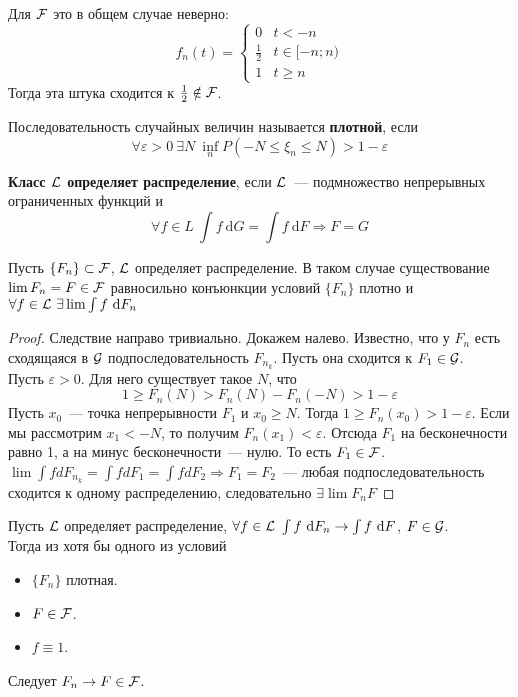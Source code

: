 \documentclass{article}
\begin{document}
    \begin{remark}
        Для ${\mathcal{F}}$ это в общем случае неверно:
        $$
        f_n(t)=\begin{cases}
            0 & t<-n\\
            \frac12 & t\in[-n;n)\\
            1 & t\geqslant n
        \end{cases}
        $$
        Тогда эта штука сходится к $\frac12\notin{\mathcal{F}}$.
    \end{remark}
    \begin{definition}
        Последовательность случайных величин называется \textbf{плотной}, если
        $$
        \forall\varepsilon>0~\exists N~\inf\limits_n P(-N\leqslant\xi_n\leqslant N)>1-\varepsilon
        $$
    \end{definition}
    \begin{definition}
        \textbf{Класс ${\mathcal{L}}$ определяет распределение}, если ${\mathcal{L}}$~--- подмножество непрерывных ограниченных функций и
        $$\forall f\in L~\int f~\mathrm dG=\int f~\mathrm dF\Rightarrow F=G$$
    \end{definition}
    \begin{theorem}
        Пусть $\{F_n\}\subset{\mathcal{F}}$, ${\mathcal{L}}$ определяет распределение. В таком случае существование $\lim F_n=F\in {\mathcal{F}}$ равносильно конъюнкции условий $\{F_n\}$ плотно и $\forall f\in{\mathcal{L}}~\exists \lim\int f~\mathrm dF_n$
    \end{theorem}
    \begin{proof}
        Следствие направо тривиально. Докажем налево. Известно, что у $F_n$ есть сходящаяся в ${\mathcal{G}}$ подпоследовательность $F_{n_k}$. Пусть она сходится к $F_1\in{\mathcal{G}}$.\\
        Пусть $\varepsilon>0$. Для него существует такое $N$, что
        $$
        1\geqslant F_n(N)>F_n(N)-F_n(-N)>1-\varepsilon
        $$
        Пусть $x_0$~--- точка непрерывности $F_1$ и $x_0\geqslant N$. Тогда $1\geqslant F_n(x_0)>1-\varepsilon$. Если мы рассмотрим $x_1<-N$, то получим $F_n(x_1)<\varepsilon$. Отсюда $F_1$ на бесконечности равно 1, а на минус бесконечности~--- нулю. То есть $F_1\in{\mathcal{F}}$.\\
         $\lim\int fdF_{n_k}=\int fdF_1=\int fdF_2\Rightarrow F_1=F_2$~--- любая подпоследовательность сходится к одному распределению, следовательно $\exists\lim F_n F$
    \end{proof}
    \begin{corollary}
        Пусть ${\mathcal{L}}$ определяет распределение, $\forall f\in{\mathcal{L}}~\int f~\mathrm dF_n\rightarrow\int f~\mathrm dF$, $F\in{\mathcal{G}}$.\\
        Тогда из хотя бы одного из условий
        \begin{itemize}
            \item $\{F_n\}$ плотная.
            \item $F\in{\mathcal{F}}$.
            \item $f\equiv1$.
        \end{itemize}
        Следует $F_n\rightarrow F\in{\mathcal{F}}$.
    \end{corollary}
 
\end{document}
